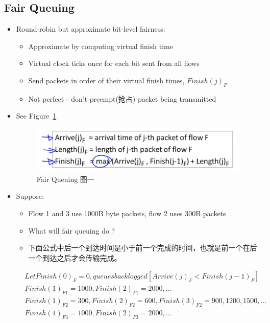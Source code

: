 \documentclass[12pt]{ctexart}   %
\begin{document}
	\subsection{Fair Queuing}
	\begin{itemize}
		\item Round-robin but approximate bit-level fairness:
		\begin{itemize}
			\item Approximate by computing virtual finish time
			\item Virtual clock ticks once for each bit sent from all flows
			\item Send packets in order of their virtual finish times, $Finish(j)_{F}$
			\item Not perfect - don't preempt(抢占) packet being transmitted
		\end{itemize}
		\item See Figure~\ref{fig:9-4-4}
		  
		 \begin{figure}[h!] %
		\centering
		 \includegraphics[scale=0.7]{images/9-4-4}
		\caption{ Fair Queuing 图一}
		 \label{fig:9-4-4}
		 \end{figure}
		 
		 \item Suppose:
		 \begin{itemize}
		 	\item Flow 1 and 3 use 1000B byte packets, flow 2 uses 300B packets
		 	\item What will fair queuing do ?
		 	\item 下面公式中后一个到达时间是小于前一个完成的时间，也就是前一个在后一个到达之后才会传输完成。
		 \end{itemize}
		 
		 \begin{equation}
		\begin{split}
		& Let Finish(0)_{F} = 0, queues backlogged [Arrive(j)_{F} < Finish(j-1)_{F}]         \\
		& Finish(1)_{F1}=1000, Finish(2)_{F1}=2000, ...             \\
		& Finish(1)_{F2}=300, Finish(2)_{F2}=600, Finish(3)_{F2}=900, 1200, 1500, ...          \\
		& Finish(1)_{F3}=1000, Finish(2)_{F3}=2000, ...
		\end{split}
		\end{equation}
		

\end{itemize}
\end{document}
